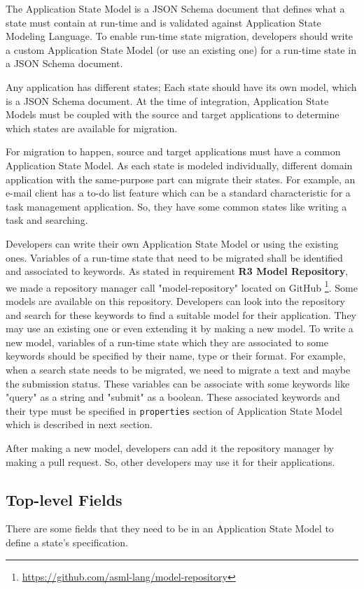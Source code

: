 
The Application State Model is a JSON Schema document that defines what a state must contain at run-time and is validated against Application State Modeling Language. To enable run-time state migration, developers should write a custom Application State Model (or use an existing one) for a run-time state in a JSON Schema document.

Any application has different states; Each state should have its own model, which is a JSON Schema document. At the time of integration, Application State Models must be coupled with the source and target applications to determine which states are available for migration.

For migration to happen, source and target applications must have a common Application State Model. As each state is modeled individually, different domain application with the same-purpose part can migrate their states. For example, an e-mail client has a to-do list feature which can be a standard characteristic for a task management application. So, they have some common states like writing a task and searching.

Developers can write their own Application State Model or using the existing ones. Variables of a run-time state that need to be migrated shall be identified and associated to keywords. As stated in requirement \textbf{R3 Model Repository}, we made a repository manager call "model-repository" located on GitHub \footnote{\href{https://github.com/asml-lang/model-repository}{https://github.com/asml-lang/model-repository}}. Some models are available on this repository. Developers can look into the repository and search for these keywords to find a suitable model for their application. They may use an existing one or even extending it by making a new model. To write a new model, variables of a run-time state which they are associated to some keywords should be specified by their name, type or their format. For example, when a search state needs to be migrated, we need to migrate a text and maybe the submission status. These variables can be associate with some keywords like "query" as a string and "submit" as a boolean. These associated keywords and their type must be specified in \lstinline[basicstyle=\ttfamily]{properties} section of Application State Model which is described in next section. 

After making a new model, developers can add it the repository manager by making a pull request. So, other developers may use it for their applications.

\subsection{Top-level Fields}
There are some fields that they need to be in an Application State Model to define a state’s specification.

